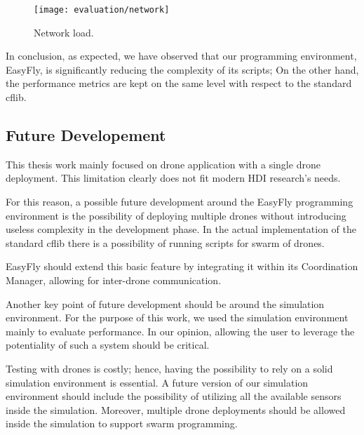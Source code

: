 \begin{figure}[tb]
    \centering
    \texttt{[image: evaluation/network]}
    \caption{Network load.}\label{fig:network_load}
\end{figure}

In conclusion, as expected, we have observed that our programming environment, EasyFly, is significantly reducing the complexity of its scripts; 
On the other hand, the performance metrics are kept on the same level with respect to the standard cflib.

\subsection{Future Developement}\label{subsec:future_developement}
This thesis work mainly focused on drone application with a single drone deployment. 
This limitation clearly does not fit modern HDI research's needs. 

For this reason, a possible future development around the EasyFly programming environment is the possibility of deploying multiple drones without introducing useless complexity in the development phase.
In the actual implementation of the standard cflib there is a possibility of running scripts for swarm of drones.

EasyFly should extend this basic feature by integrating it within its Coordination Manager, allowing for inter-drone communication.

Another key point of future development should be around the simulation environment. 
For the purpose of this work, we used the simulation environment mainly to evaluate performance.
In our opinion, allowing the user to leverage the potentiality of such a system should be critical.

Testing with drones is costly; hence, having the possibility to rely on a solid simulation environment is essential.
A future version of our simulation environment should include the possibility of utilizing all the available sensors inside the simulation. 
Moreover, multiple drone deployments should be allowed inside the simulation to support swarm programming.